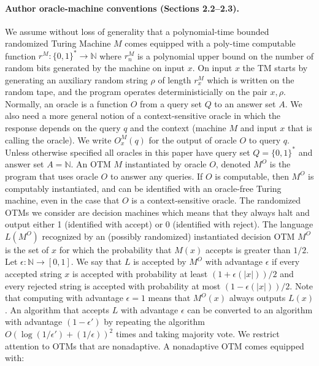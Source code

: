 \paragraph{Author oracle-machine conventions (Sections 2.2--2.3).}
We assume without loss of generality that a polynomial-time bounded randomized Turing Machine $M$ comes equipped with a poly-time computable function $r^M:\{0,1\}^*\to\mathbb N$ where $r_n^M$ is a polynomial upper bound on the number of random bits generated by the machine on input $x$. On input $x$ the TM starts by generating an auxiliary random string $\rho$ of length $r_x^M$ which is written on the random tape, and the program operates deterministicially on the pair $x,\rho$.
Normally, an oracle is a function $O$ from a query set $Q$ to an answer set $A$. We also need a more general notion of a context-sensitive oracle in which the response depends on the query $q$ and the context (machine $M$ and input $x$ that is calling the oracle). We write $O_x^M(q)$ for the output of oracle $O$ to query $q$.
Unless otherwise specified all oracles in this paper have query set $Q=\{0,1\}^*$ and answer set $A=\mathbb N$.
An OTM $M$ instantiated by oracle $O$, denoted $M^O$ is the program that uses oracle $O$ to answer any queries. If $O$ is computable, then $M^O$ is computably instantiated, and can be identified with an oracle-free Turing machine, even in the case that $O$ is a context-sensitive oracle.
The randomized OTMs we consider are decision machines which means that they always halt and output either 1 (identified with accept) or 0 (identified with reject). The language $L(M^O)$ recognized by an (possibly randomized) instantiated decision OTM $M^O$ is the set of $x$ for which the probability that $M(x)$ accepts is greater than $1/2$.
Let $\epsilon:\mathbb N\to[0,1]$. We say that $L$ is accepted by $M^O$ with advantage $\epsilon$ if every accepted string $x$ is accepted with probability at least $(1+\epsilon(|x|))/2$ and every rejected string is accepted with probability at most $(1-\epsilon(|x|))/2$. Note that computing with advantage $\epsilon=1$ means that $M^O(x)$ always outputs $L(x)$.
An algorithm that accepts $L$ with advantage $\epsilon$ can be converted to an algorithm with advantage $(1-\epsilon')$ by repeating the algorithm $O(\log(1/\epsilon')+(1/\epsilon))^2$ times and taking majority vote.
We restrict attention to OTMs that are nonadaptive. A nonadaptive OTM comes equipped with:
